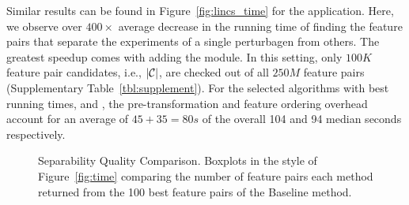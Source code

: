 Similar results can be found in Figure~\ref{fig:lincs_time} for the \lincs application. Here, we observe over $400\times$ average decrease in the running time of finding the \topk feature pairs that separate the \lincs experiments of a single perturbagen from others. The greatest speedup comes with adding the \sampling module. In this setting, only $100K$ feature pair candidates, i.e., $|\cc|$, are checked out of all $250M$ feature pairs (Supplementary Table~\ref{tbl:supplement}). For the selected algorithms with best running times, \horiz and \vertic, the pre-transformation and feature ordering overhead account for an average of $45+35=80s$ of the overall 104 and 94 median seconds respectively.



\begin{figure}[h]
\centering %
\vspace{-5mm}
\vspace{-5mm}
\caption{Separability Quality Comparison. Boxplots in the style of Figure~\ref{fig:time} comparing the number of feature pairs each method returned from the 100 best feature pairs of the Baseline method.}
\vspace{-5mm}
\label{fig:separability}
\end{figure}


